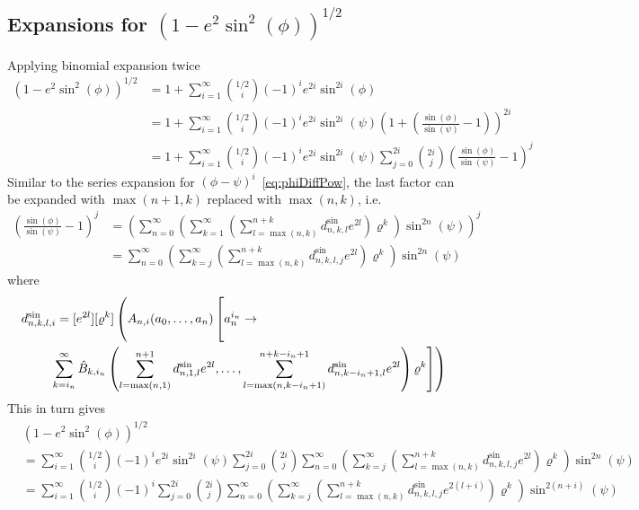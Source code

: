 \documentclass[a4paper]{amsart}
\begin{document}
\subsection{Expansions for $(1-e^2\sin^2(\phi))^{1/2}$}
Applying binomial expansion twice
\begin{align*}
(1-e^2\sin^2(\phi))^{1/2}&=1 + \sum_{i=1}^\infty\binom{1/2}{i}(-1)^ie^{2i}\sin^{2i}(\phi)\\
&=1 + \sum_{i=1}^\infty\binom{1/2}{i}(-1)^ie^{2i}\sin^{2i}(\psi)\left(1+\left(\frac{\sin(\phi)}{\sin(\psi)}-1\right)\right)^{2i}\\
&=1 + \sum_{i=1}^\infty\binom{1/2}{i}(-1)^ie^{2i}\sin^{2i}(\psi)\sum_{j=0}^{2i}\binom{2i}{j}\left(\frac{\sin(\phi)}{\sin(\psi)}-1\right)^{j}
\end{align*}
Similar to the series expansion for $(\phi-\psi)^i$~\eqref{eq:phiDiffPow}, the last factor can be expanded with $\max(n+1,k)$ replaced with $\max(n,k)$, i.e.
\begin{align*}
\left(\frac{\sin(\phi)}{\sin(\psi)}-1\right)^j&=\left(\sum_{n=0}^\infty \left(\sum_{k=1}^\infty\left(\sum_{l=\max(n,k)}^{n+k} d^{\sin}_{n,k,l}e^{2l}\right)\varrho^k\right)\sin^{2n}(\psi)\right)^{j}\\
&=\sum_{n=0}^\infty \left(\sum_{k=j}^\infty\left(\sum_{l=\max(n,k)}^{n+k} d^{\sin}_{n,k,l,j}e^{2l}\right)\varrho^k\right)\sin^{2n}(\psi)
\end{align*}
where
\begin{align*}
d_{n,k,l,i}^{\sin}&=[e^{2l}][\varrho^k]\left(\rule{0cm}{7mm}A_{n,i}(a_0,\dots,a_n)\left[\rule{0cm}{7mm}a_n^{i_n}\rightarrow\right.\right.\\
&\!\!\!\!\left.\left.\sum_{k=i_n}^\infty \hat{B}_{k,i_n}\left(\sum_{l=\max(n,1)}^{n+1} d^{\sin}_{n,1,l} e^{2l},\dots,\sum_{l=\max(n,k-i_n+1)}^{n+k-i_n+1} d^{\sin}_{n,k-i_n+1,l} e^{2l}\right)\varrho^k\right]\right)
\end{align*}
This in turn gives
\begin{align*}
&(1-e^2\sin^2(\phi))^{1/2}\\
&=\sum_{i=1}^\infty\!\binom{1/2}{i}(-1)^ie^{2i}\sin^{2i}(\psi)\sum_{j=0}^{2i}\!\binom{2i}{j}\sum_{n=0}^\infty \left(\sum_{k=j}^\infty\left(\sum_{l=\max(n,k)}^{n+k}\!\!\!\!\! d^{\sin}_{n,k,l,j}e^{2l}\!\right)\!\varrho^k\right)\!\sin^{2n}(\psi)\\
&=\sum_{i=1}^\infty\binom{1/2}{i}(-1)^i\sum_{j=0}^{2i}\binom{2i}{j}\sum_{n=0}^\infty \left(\sum_{k=j}^\infty\left(\sum_{l=\max(n,k)}^{n+k} d^{\sin}_{n,k,l,j}e^{2(l+i)}\right)\varrho^k\right)\sin^{2(n+i)}(\psi)
\end{align*}
\end{document}
